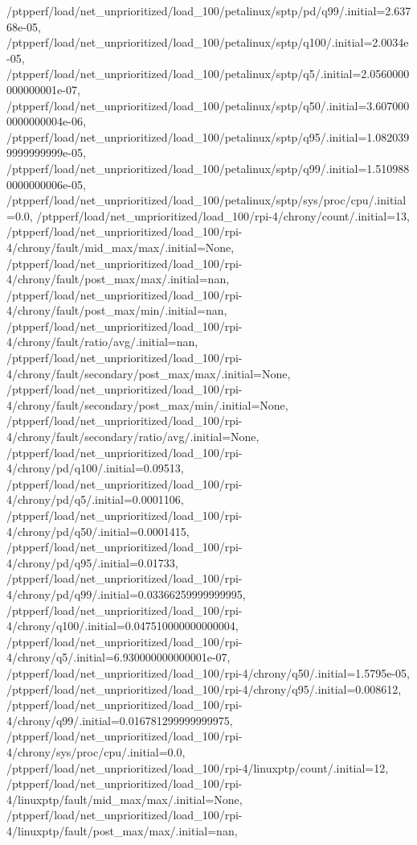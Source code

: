 {    /ptpperf/load/net_unprioritized/load_100/petalinux/sptp/pd/q99/.initial=2.63768e-05,
    /ptpperf/load/net_unprioritized/load_100/petalinux/sptp/q100/.initial=2.0034e-05,
    /ptpperf/load/net_unprioritized/load_100/petalinux/sptp/q5/.initial=2.0560000000000001e-07,
    /ptpperf/load/net_unprioritized/load_100/petalinux/sptp/q50/.initial=3.6070000000000004e-06,
    /ptpperf/load/net_unprioritized/load_100/petalinux/sptp/q95/.initial=1.0820399999999999e-05,
    /ptpperf/load/net_unprioritized/load_100/petalinux/sptp/q99/.initial=1.5109880000000006e-05,
    /ptpperf/load/net_unprioritized/load_100/petalinux/sptp/sys/proc/cpu/.initial=0.0,
    /ptpperf/load/net_unprioritized/load_100/rpi-4/chrony/count/.initial=13,
    /ptpperf/load/net_unprioritized/load_100/rpi-4/chrony/fault/mid_max/max/.initial=None,
    /ptpperf/load/net_unprioritized/load_100/rpi-4/chrony/fault/post_max/max/.initial=nan,
    /ptpperf/load/net_unprioritized/load_100/rpi-4/chrony/fault/post_max/min/.initial=nan,
    /ptpperf/load/net_unprioritized/load_100/rpi-4/chrony/fault/ratio/avg/.initial=nan,
    /ptpperf/load/net_unprioritized/load_100/rpi-4/chrony/fault/secondary/post_max/max/.initial=None,
    /ptpperf/load/net_unprioritized/load_100/rpi-4/chrony/fault/secondary/post_max/min/.initial=None,
    /ptpperf/load/net_unprioritized/load_100/rpi-4/chrony/fault/secondary/ratio/avg/.initial=None,
    /ptpperf/load/net_unprioritized/load_100/rpi-4/chrony/pd/q100/.initial=0.09513,
    /ptpperf/load/net_unprioritized/load_100/rpi-4/chrony/pd/q5/.initial=0.0001106,
    /ptpperf/load/net_unprioritized/load_100/rpi-4/chrony/pd/q50/.initial=0.0001415,
    /ptpperf/load/net_unprioritized/load_100/rpi-4/chrony/pd/q95/.initial=0.01733,
    /ptpperf/load/net_unprioritized/load_100/rpi-4/chrony/pd/q99/.initial=0.03366259999999995,
    /ptpperf/load/net_unprioritized/load_100/rpi-4/chrony/q100/.initial=0.047510000000000004,
    /ptpperf/load/net_unprioritized/load_100/rpi-4/chrony/q5/.initial=6.930000000000001e-07,
    /ptpperf/load/net_unprioritized/load_100/rpi-4/chrony/q50/.initial=1.5795e-05,
    /ptpperf/load/net_unprioritized/load_100/rpi-4/chrony/q95/.initial=0.008612,
    /ptpperf/load/net_unprioritized/load_100/rpi-4/chrony/q99/.initial=0.016781299999999975,
    /ptpperf/load/net_unprioritized/load_100/rpi-4/chrony/sys/proc/cpu/.initial=0.0,
    /ptpperf/load/net_unprioritized/load_100/rpi-4/linuxptp/count/.initial=12,
    /ptpperf/load/net_unprioritized/load_100/rpi-4/linuxptp/fault/mid_max/max/.initial=None,
    /ptpperf/load/net_unprioritized/load_100/rpi-4/linuxptp/fault/post_max/max/.initial=nan,
}
